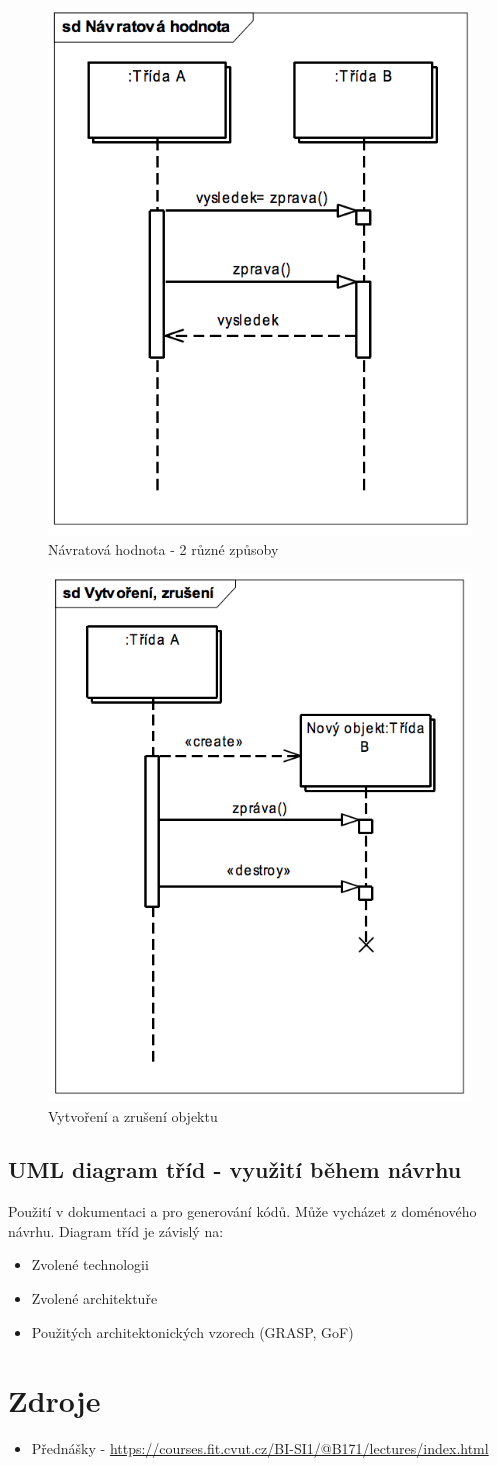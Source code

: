 \documentclass{szzclass}
\begin{document}
\begin{figure}[ht!]
\centering
\includegraphics[width=.55\linewidth]{topics/bi-wsi-si-20/images/sekvencni-navratova.png}
\caption{Návratová hodnota - 2 různé způsoby}
\end{figure}

\begin{figure}[ht!]
\centering
\includegraphics[width=.55\linewidth]{topics/bi-wsi-si-20/images/sekvencni-vytvareni.png}
\caption{Vytvoření a zrušení objektu}
\end{figure}

\subsection{UML diagram tříd - využití během návrhu}
Použití v dokumentaci a pro generování kódů. Může vycházet z doménového návrhu. Diagram tříd je závislý na:
\begin{itemize}
\item Zvolené technologii
\item Zvolené architektuře
\item Použitých architektonických vzorech (GRASP, GoF)
\end{itemize}

\section{Zdroje}
\begin{itemize}
\item Přednášky - \url{https://courses.fit.cvut.cz/BI-SI1/@B171/lectures/index.html}
\end{itemize}
\end{document}
